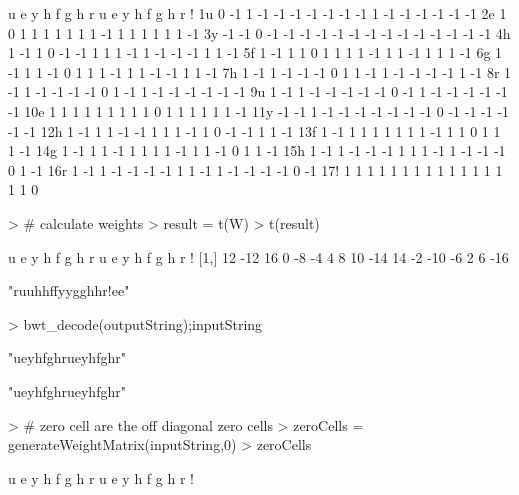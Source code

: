\documentclass{article}
\begin{document}
\begin{Schunk}
\begin{Soutput}
     u  e y  h  f  g  h  r  u  e  y  h  f  g  h  r  !
1u   0 -1 1 -1 -1 -1 -1 -1 -1 -1  1 -1 -1 -1 -1 -1 -1
2e   1  0 1  1  1  1  1  1  1 -1  1  1  1  1  1  1 -1
3y  -1 -1 0 -1 -1 -1 -1 -1 -1 -1 -1 -1 -1 -1 -1 -1 -1
4h   1 -1 1  0 -1 -1  1  1  1 -1  1 -1 -1 -1  1  1 -1
5f   1 -1 1  1  0  1  1  1  1 -1  1  1 -1  1  1  1 -1
6g   1 -1 1  1 -1  0  1  1  1 -1  1  1 -1 -1  1  1 -1
7h   1 -1 1 -1 -1 -1  0  1  1 -1  1 -1 -1 -1 -1  1 -1
8r   1 -1 1 -1 -1 -1 -1  0  1 -1  1 -1 -1 -1 -1 -1 -1
9u   1 -1 1 -1 -1 -1 -1 -1  0 -1  1 -1 -1 -1 -1 -1 -1
10e  1  1 1  1  1  1  1  1  1  0  1  1  1  1  1  1 -1
11y -1 -1 1 -1 -1 -1 -1 -1 -1 -1  0 -1 -1 -1 -1 -1 -1
12h  1 -1 1  1 -1 -1  1  1  1 -1  1  0 -1 -1  1  1 -1
13f  1 -1 1  1  1  1  1  1  1 -1  1  1  0  1  1  1 -1
14g  1 -1 1  1 -1  1  1  1  1 -1  1  1 -1  0  1  1 -1
15h  1 -1 1 -1 -1 -1  1  1  1 -1  1 -1 -1 -1  0  1 -1
16r  1 -1 1 -1 -1 -1 -1  1  1 -1  1 -1 -1 -1 -1  0 -1
17!  1  1 1  1  1  1  1  1  1  1  1  1  1  1  1  1  0
\end{Soutput}
\begin{Sinput}
> # calculate weights
> result = t(W)%*%v
> t(result)
\end{Sinput}
\begin{Soutput}
      u   e  y h  f  g h r  u   e  y  h   f  g h r   !
[1,] 12 -12 16 0 -8 -4 4 8 10 -14 14 -2 -10 -6 2 6 -16
\end{Soutput}
\begin{Soutput}
[1] "ruuhhffyygghhr!ee"
\end{Soutput}
\begin{Sinput}
> bwt_decode(outputString);inputString
\end{Sinput}
\begin{Soutput}
[1] "ueyhfghrueyhfghr"
\end{Soutput}
\begin{Soutput}
[1] "ueyhfghrueyhfghr"
\end{Soutput}
\begin{Sinput}
> # zero cell are the off diagonal zero cells
> zeroCells = generateWeightMatrix(inputString,0)
> zeroCells
\end{Sinput}
\begin{Soutput}
     u  e y  h  f  g  h  r  u  e y  h  f  g  h  r  !

\end{Soutput}
\end{Schunk}
\end{document}
